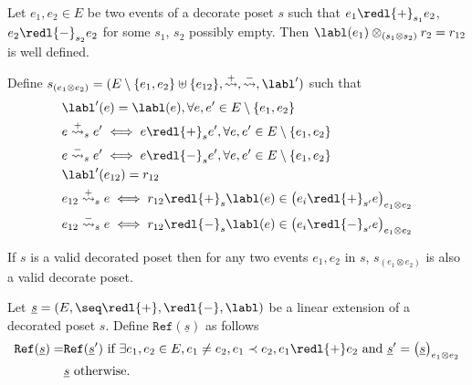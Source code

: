 \begin{definition}
  Let $e_1,e_2\in E$ be two events of a decorate poset $s$ such that $e_1\redl{+}_{s_1}e_2$, $e_2\redl{-}_{s_2}e_2$ for some $s_1$, $s_2$ possibly empty. Then $\labl(e_1)\otimes_{(s_1\otimes s_2)} r_2=r_{12}$ is well defined.

  Define $s_{(e_1\otimes e_2)} = (E\setminus\{e_1,e_2\}\uplus\{e_{12}\},\overset{+}{\leadsto},\overset{-}{\leadsto},\labl')$ such that
    \begin{align*}
    &\labl'(e)=\labl(e), \forall e,e'\in E\setminus\{e_1,e_2\}\\
    &e\overset{+}{\leadsto}_s e' \iff e\redl{+}_s e', \forall e,e'\in E\setminus\{e_1,e_2\}\\
    &e\overset{-}{\leadsto}_s e' \iff e\redl{-}_s e', \forall e,e'\in E\setminus\{e_1,e_2\}\\
    &\labl'(e_{12}) = r_{12}\\
    &e_{12}\overset{+}{\leadsto}_s e \iff r_{12}\redl{+}_s \labl(e)\in \big(e_i \redl{+}_{s'} e\big)_{e_1\otimes e_2}\\
    &e_{12}\overset{-}{\leadsto}_s e \iff r_{12}\redl{-}_s \labl(e)\in \big(e_i \redl{-}_{s'} e\big)_{e_1\otimes e_2}\\
  \end{align*}
\end{definition}

\begin{lemma}
  If $s$ is a valid decorated poset then for any two events $e_1,e_2$ in $s$, $s_{(e_1\otimes e_2)}$ is also a valid decorate poset.
\end{lemma}


\begin{definition}
  \label{def:ref_poset}
  Let $\underline s=(E,\seq\redl{+},\redl{-},\labl)$ be a linear extension of a decorated poset $s$.
  Define $\mathtt{Ref}(\underline s)$ as follows
  \begin{align*}
    \mathtt{Ref}(\underline s) =&
    \mathtt{Ref}(\underline s')\text{ if }\exists e_1,e_2\in E, e_1\neq e_2, e_1\prec e_2, e_1\redl{+}e_2
    \text{ and }\underline s'=\big(\underline s\big)_{e_1\otimes e_2}
    \\
    &\underline s\text{ otherwise.}\\
  \end{align*}
\end{definition}
